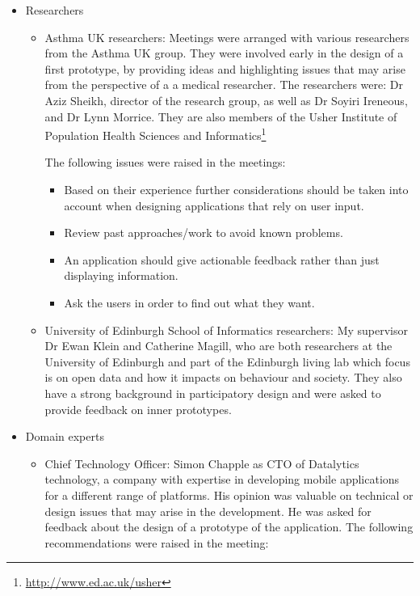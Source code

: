 \begin{itemize}
	\item Researchers 
    \begin{itemize}
      \item Asthma UK researchers: Meetings were arranged with various researchers from the Asthma UK group. They were involved early in the design of a first prototype, by providing ideas and highlighting issues that may arise from the perspective of a a medical researcher. The researchers were:  Dr Aziz Sheikh, director of the research group, as well as Dr Soyiri Ireneous, and Dr Lynn Morrice. They are also members of the Usher Institute of Population Health Sciences and Informatics\footnote{\url{http://www.ed.ac.uk/usher}}
      
    The following issues were raised in the meetings:
      \begin{itemize}
          \item Based on their experience further considerations should be taken into account when designing applications that rely on user input.
          \item Review past approaches/work to avoid known problems.
          \item An application should give actionable feedback rather than just displaying information.
          \item Ask the users in order to find out what they want.
      \end{itemize}
      \item University of Edinburgh School of Informatics researchers: My supervisor Dr Ewan Klein and Catherine Magill, who are both researchers at the University of Edinburgh and part of the Edinburgh living lab which focus is on open data and how it impacts on behaviour and society. They also have a strong background in participatory design and were asked to provide feedback on inner prototypes.
	\end{itemize}
	\item Domain experts    
   \begin{itemize}
      \item Chief Technology Officer: Simon Chapple as CTO of Datalytics technology, a company with expertise in developing mobile applications for a different range of platforms. His opinion was valuable on technical or design issues that may arise in the development. He was asked for feedback about the design of a prototype of the application.
    The following recommendations were raised in the meeting:
    \begin{itemize}

\end{itemize}
\end{itemize}
\end{itemize}

